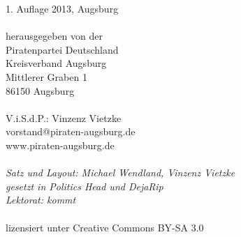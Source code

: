 \thispagestyle{empty}
\vspace*{\fill}
\begin{minipage}{\textwidth}
  \begin{small}
    \begin{singlespace}
       1. Auflage 2013, Augsburg\\
       \\
       herausgegeben von der\\
       Piratenpartei Deutschland\\
       Kreisverband Augsburg\\
       Mittlerer Graben 1\\
       86150 Augsburg\\
       \\
       V.i.S.d.P.: Vinzenz Vietzke\\
       vorstand@piraten-augsburg.de\\
       www.piraten-augsburg.de\\
       \\
       \textit{
         Satz und Layout: Michael Wendland, Vinzenz Vietzke\\
         gesetzt in Politics Head und DejaRip\\
         Lektorat: kommt
        }\\
        \\
        lizensiert unter Creative Commons BY-SA 3.0
    \end{singlespace}
  \end{small}
\end{minipage}

